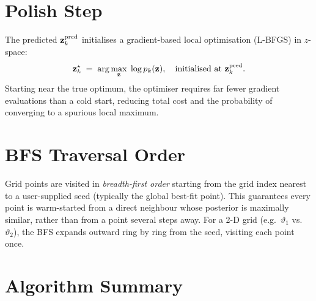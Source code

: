 \documentclass[11pt, a4paper]{article}
\newcommand{\zz}{\mathbf{z}}
\begin{document}
\section{Polish Step}

The predicted $\zz^{\rm pred}_k$ initialises a gradient-based local optimisation
(L-BFGS) in $z$-space:
\begin{equation}
  \zz^\star_k
  \;=\; \arg\max_{\zz}\;\log p_k(\zz),
  \quad\text{initialised at }\zz^{\rm pred}_k.
\end{equation}
Starting near the true optimum, the optimiser requires far fewer gradient
evaluations than a cold start, reducing total cost and the probability of
converging to a spurious local maximum.

\section{BFS Traversal Order}

Grid points are visited in \emph{breadth-first order} starting from the grid
index nearest to a user-supplied seed (typically the global best-fit point).
This guarantees every point is warm-started from a direct neighbour whose
posterior is maximally similar, rather than from a point several steps away.
For a 2-D grid (e.g.\ $\vartheta_{1}$ vs.\ $\vartheta_{2}$), the BFS expands
outward ring by ring from the seed, visiting each point once.

\section{Algorithm Summary}
\end{document}
